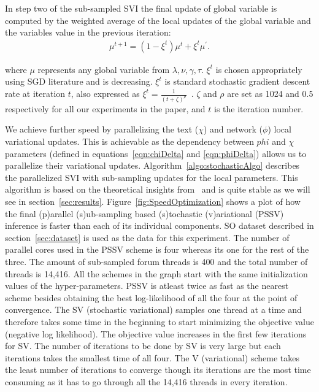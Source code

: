 \documentclass{sig-alternate}
\begin{document}
In step two of the sub-sampled SVI the final update of global variable is
computed by the weighted average of the local updates of the global variable and
the variables value in the previous iteration:
\small
\begin{align}
\mu^{t+1} = (1-\xi^t)\mu^{t} + \xi^t\mu^{'}. 
\label{eqn:globalUpStoc}
\end{align} 
\normalsize
\vspace*{-1\baselineskip}

where $\mu$ represents any global variable from $\lambda, \nu, \gamma, \tau$.
 $\xi^t$ is chosen appropriately using SGD literature and is
decreasing.  $\xi^t$ is standard stochastic
gradient descent rate at iteration $t$, also expressed as $\xi^t =
\frac{1}{(t+\zeta)^{\rho}}$~\cite{conf/nips/GopalanMGFB12}. $\zeta$ and
$\rho$ are set as 1024 and 0.5 respectively for all our experiments in the
paper, and $t$ is the iteration number. 

We achieve further speed by parallelizing the text ($\chi$) and network
($\phi$) local variational updates. This is achievable  as the
dependency between $phi$ and $\chi$ parameters (defined in
equations~\ref{eqn:chiDelta} and \ref{eqn:phiDelta}) allows us to parallelize their
variational updates.
Algorithm~\ref{algo:stochasticAlgo} describes the parallelized SVI with
sub-sampling updates for the local parameters. This algorithm is 
based on the theoretical insights from~\cite{Hoffman:2013:SVI} and is 
quite stable as we will see in section~\ref{sec:results}. 
Figure~\ref{fig:SpeedOptimization} 
shows a plot of how the final (p)arallel (s)ub-sampling based (s)tochastic
(v)ariational (PSSV) inference is faster than each of its individual components.
SO dataset described in section~\ref{sec:dataset} is used as the data for this 
experiment.
The number of parallel cores used in the PSSV scheme is four whereas its one
for the rest of the three.
The amount of sub-sampled forum threads is 400 and the total number of threads is 14,416.
All the schemes in the graph start with the same initialization values of the
hyper-parameters. PSSV is atleast twice as fast as the nearest scheme besides
obtaining the best log-likelihood of all the four at the point of convergence.
The SV (stochastic variational) samples one thread at a time and therefore
takes some time in the beginning to start minimizing the objective value
(negative log likelihood).
The objective value increases in the first few iterations for SV. The number of
iterations to be done by SV is very large but each iterations takes the smallest time of
all four. The V (variational) scheme takes the least number of iterations to
converge though its iterations are the most time consuming as it has to go
through all the 14,416 threads in every iteration. 
\end{document}
